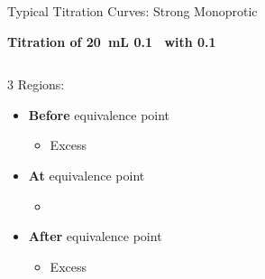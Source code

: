 \documentclass[handout]{beamer}
\begin{document}
\begin{frame}[t]{Typical Titration Curves: Strong Monoprotic}
	\begin{center}
		\bfseries
		Titration of \SI{20}{\milli\liter} \SI{0.1}{\Molar}~
		with \SI{0.1}{\Molar}~
	\end{center}

	\begin{columns}[t]
		
		\begin{block}{3 Regions:}
			\begin{itemize}
				\item \textbf{Before} equivalence point
					\begin{itemize}
						\item<2-> Excess 
					\end{itemize}
				\item \textbf{At} equivalence point
					\begin{itemize}
						\item<3-> \ch{[NaOH] = [HCl]}
					\end{itemize}
				\item \textbf{After} equivalence point
					\begin{itemize}
						\item<4-> Excess 
					\end{itemize}
			\end{itemize}
		\end{block}
	\end{columns}
\end{frame}
\end{document}
